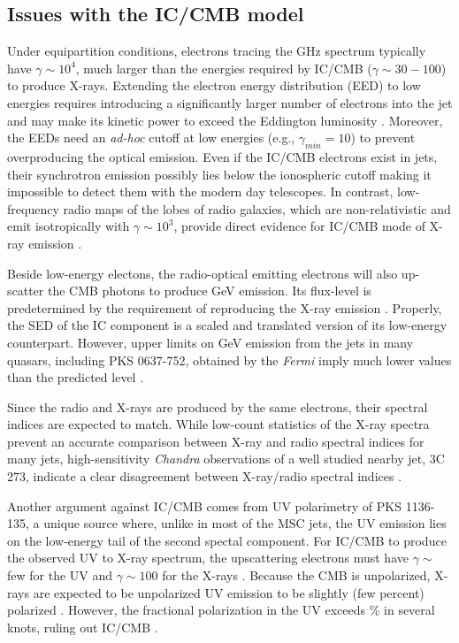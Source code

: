 \subsection{Issues with the IC/CMB model}
Under equipartition conditions, electrons tracing the GHz spectrum typically have $\gamma\sim10^4$, much larger than the  energies required by IC/CMB ($\gamma\sim 30-100$) to produce X-rays. Extending the electron energy distribution (EED) to low energies requires introducing a significantly larger number of electrons into the jet and may make its kinetic power to exceed the Eddington luminosity  \citep{dermer2004nonthermal}. Moreover, the EEDs need an \textit{ad-hoc} cutoff at low energies (e.g., $\gamma_{min}=10$) to prevent overproducing the optical emission. Even if the IC/CMB electrons exist in jets, their synchrotron emission possibly lies below the ionospheric cutoff making it impossible to detect them with the modern day telescopes. In contrast, low-frequency radio maps of the lobes of radio galaxies, which are non-relativistic and emit isotropically with $\gamma\sim10^3$, provide direct evidence for IC/CMB mode of X-ray emission   \citep[e.g., ][]{1995ApJ...449L.149F}.

Beside low-energy electons, the radio-optical emitting electrons will also up-scatter the CMB photons to produce  GeV emission. Its flux-level is predetermined by the requirement of reproducing the X-ray emission \citep{georganopoulos2006quasar}. Properly, the SED of the IC component is a scaled and translated version of its low-energy counterpart. However, upper limits on GeV emission from the jets in many quasars, including PKS 0637-752, obtained by the \textit{Fermi} imply much lower values than the predicted level \citep{meyer2015ruling,breiding2017fermi}. 

Since the radio and X-rays are produced by the same electrons, their spectral indices are expected to match. While low-count statistics of the X-ray spectra prevent an accurate comparison between X-ray and radio spectral indices for many jets, high-sensitivity \textit{Chandra} observations of a well studied nearby jet,  3C 273, indicate a clear disagreement between X-ray/radio spectral indices \citep{jester2006new}.

Another argument against IC/CMB comes from UV polarimetry of
PKS 1136-135, a unique source where, unlike in most of the MSC jets, the UV emission lies on the low-energy tail of the second spectal component. For IC/CMB to produce the observed UV to X-ray spectrum, the upscattering electrons must have $\gamma\sim$ few for the UV and $\gamma\sim100$ for the X-rays \citep{uchiyama2007infrared}. Because the CMB is unpolarized, X-rays are expected to be unpolarized UV emission to be slightly (few percent) polarized  \citep{uchiyama_2008,mcnamara2009x}. However, the fractional polarization in the UV exceeds \% in several knots, ruling out IC/CMB \citep{cara2013polarimetry}.

